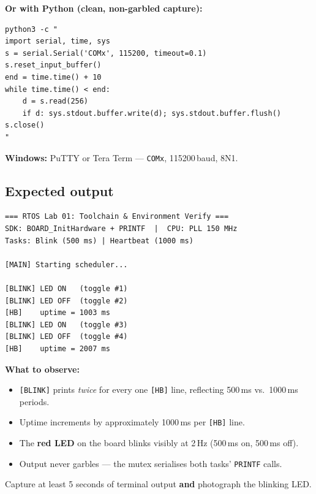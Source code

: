 \documentclass[11pt, a4paper]{article}
\newcommand{\api}[1]{\texttt{\small #1}}
\begin{document}
\textbf{Or with Python (clean, non-garbled capture):}
\begin{lstlisting}[style=bashstyle]
python3 -c "
import serial, time, sys
s = serial.Serial('COMx', 115200, timeout=0.1)
s.reset_input_buffer()
end = time.time() + 10
while time.time() < end:
    d = s.read(256)
    if d: sys.stdout.buffer.write(d); sys.stdout.buffer.flush()
s.close()
"
\end{lstlisting}

\textbf{Windows:} PuTTY or Tera Term --- \texttt{COMx}, 115200\,baud, 8N1.

\subsection{Expected output}

\begin{lstlisting}[style=textstyle]
=== RTOS Lab 01: Toolchain & Environment Verify ===
SDK: BOARD_InitHardware + PRINTF  |  CPU: PLL 150 MHz
Tasks: Blink (500 ms) | Heartbeat (1000 ms)

[MAIN] Starting scheduler...

[BLINK] LED ON   (toggle #1)
[BLINK] LED OFF  (toggle #2)
[HB]    uptime = 1003 ms
[BLINK] LED ON   (toggle #3)
[BLINK] LED OFF  (toggle #4)
[HB]    uptime = 2007 ms
\end{lstlisting}

\begin{tipbox}
  \textbf{What to observe:}
  \begin{itemize}[noitemsep]
    \item \texttt{[BLINK]} prints \emph{twice} for every one \texttt{[HB]} line,
          reflecting 500\,ms vs.\ 1000\,ms periods.
    \item Uptime increments by approximately 1000\,ms per \texttt{[HB]} line.
    \item The \textbf{red LED} on the board blinks visibly at 2\,Hz
          (500\,ms on, 500\,ms off).
    \item Output never garbles --- the mutex serialises both tasks' \api{PRINTF} calls.
  \end{itemize}
\end{tipbox}

\begin{checkpointbox}
  Capture at least 5 seconds of terminal output \textbf{and} photograph the blinking LED.
\end{checkpointbox}

\end{document}

